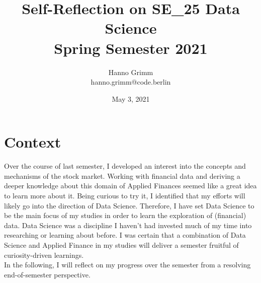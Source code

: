 \documentclass[a4paper]{article}
\title{%
Self-Reflection on SE\_25 Data Science \\
  \large Spring Semester 2021}
\author{Hanno Grimm\\hanno.grimm@code.berlin}
\date{May 3, 2021}
\begin{document}
\maketitle

\newpage 
\tableofcontents
\newpage 
\section{Context}
Over the course of last semester, I developed an interest into the concepts and mechanisms of the stock market. 
Working with financial data and deriving a deeper knowledge about this domain of Applied Finances seemed like a great idea to learn more about it.
Being curious to try it, I identified that my efforts will likely go into the direction of Data Science.
Therefore, I have set Data Science to be the main focus of my studies in order to learn the exploration of (financial) data.
Data Science was a discipline I haven't had invested much of my time into researching or learning about before. I was certain that a combination of Data Science and Applied Finance in my studies will deliver a semester fruitful of curiosity-driven learnings.
\\\newline
In the following, I will reflect on my progress over the semester from a resolving end-of-semester perspective. 
\end{document}
